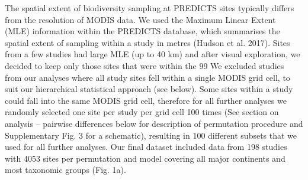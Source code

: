 	The spatial extent of biodiversity sampling at PREDICTS sites typically differs from the resolution of MODIS data. We used the Maximum Linear Extent (MLE) information within the PREDICTS database, which summarises the spatial extent of sampling within a study in metres (Hudson et al. 2017). Sites from a few studies had large MLE (up to 40 km) and after visual exploration, we decided to keep only those sites that were within the 99 %
We excluded studies from our analyses where all study sites fell within a single MODIS grid cell, to suit our hierarchical statistical approach (see below). Some sites within a study could fall into the same MODIS grid cell, therefore for all further analyses we randomly selected one site per study per grid cell 100 times (See section on analysis – pairwise differences below for description of permutation procedure and Supplementary Fig. 3 for a schematic), resulting in 100 different subsets that we used for all further analyses. Our final dataset included data from 198 studies with 4053 sites per permutation and model covering all major continents and most taxonomic groups (Fig. 1a).

